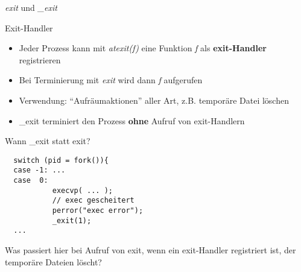 \documentclass[utf8,9pt]{beamer}
\newenvironment{blue}{\color{blue}}{}
\begin{document}
\begin{frame}[fragile]{{\em exit\/} und {\em \_exit\/}}{}

\begin{block}{Exit-Handler}
\begin{itemize}
\item Jeder Prozess kann mit {\em atexit(f)\/} eine Funktion {\em f\/}
   als {\bf exit-Handler} registrieren
\item Bei Terminierung mit {\em exit\/} wird dann {\em f\/} aufgerufen
\item Verwendung: "`Aufräumaktionen"' aller Art, z.B. temporäre Datei löschen 
\item \_exit terminiert den Prozess {\bf ohne} Aufruf von exit-Handlern 
\end{itemize}
\end{block}

\begin{block}{Wann \_exit statt exit?}
\footnotesize
\begin{verbatim}
  switch (pid = fork()){
  case -1: ...
  case  0:
           execvp( ... );
           // exec gescheitert
           perror("exec error");
           _exit(1);
  ...
\end{verbatim}
\small
\begin{blue}
Was passiert hier bei Aufruf von exit, wenn ein exit-Handler registriert
ist, der temporäre Dateien löscht?
\end{blue}

\end{block}

\end{frame}
\end{document}
